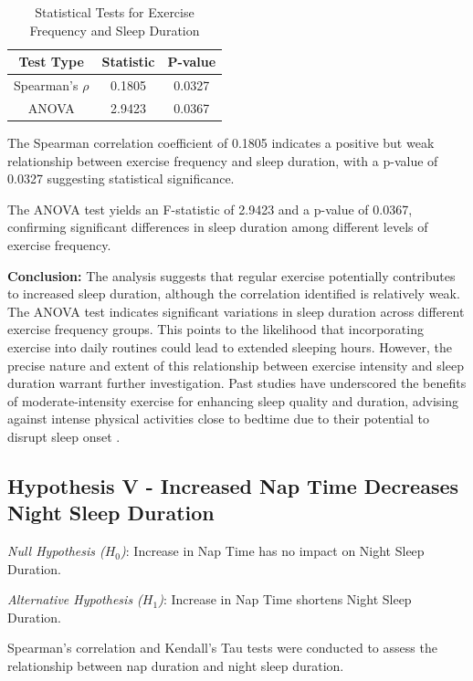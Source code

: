 \documentclass[conference]{IEEEtran}
\begin{document}
\begin{table}[ht]
\centering
\caption{Statistical Tests for Exercise Frequency and Sleep Duration}
\label{tab:hypothesis4b}
\begin{tabular}{|c|c|c|}
\hline
\textbf{Test Type} & \textbf{Statistic} & \textbf{P-value} \\
\hline
Spearman's \(\rho\) & 0.1805 & 0.0327 \\
\hline
ANOVA & 2.9423 & 0.0367 \\
\hline
\end{tabular}
\end{table}

The Spearman correlation coefficient of 0.1805 indicates a positive but weak relationship between exercise frequency and sleep duration, with a p-value of 0.0327 suggesting statistical significance.

The ANOVA test yields an F-statistic of 2.9423 and a p-value of 0.0367, confirming significant differences in sleep duration among different levels of exercise frequency.

\textbf{Conclusion:}
The analysis suggests that regular exercise potentially contributes to increased sleep duration, although the correlation identified is relatively weak. The ANOVA test indicates significant variations in sleep duration across different exercise frequency groups. This points to the likelihood that incorporating exercise into daily routines could lead to extended sleeping hours. However, the precise nature and extent of this relationship between exercise intensity and sleep duration warrant further investigation. Past studies have underscored the benefits of moderate-intensity exercise for enhancing sleep quality and duration, advising against intense physical activities close to bedtime due to their potential to disrupt sleep onset \cite{sleepfoundation, aasmsleep, mayoclinicsleep}.

\subsection*{Hypothesis V - Increased Nap Time Decreases Night Sleep Duration}
\textit{Null Hypothesis (\(H_0\))}: Increase in Nap Time has no impact on Night Sleep Duration.

\textit{Alternative Hypothesis (\(H_1\))}: Increase in Nap Time shortens Night Sleep Duration.

Spearman's correlation and Kendall’s Tau tests were conducted to assess the relationship between nap duration and night sleep duration.
\end{document}
